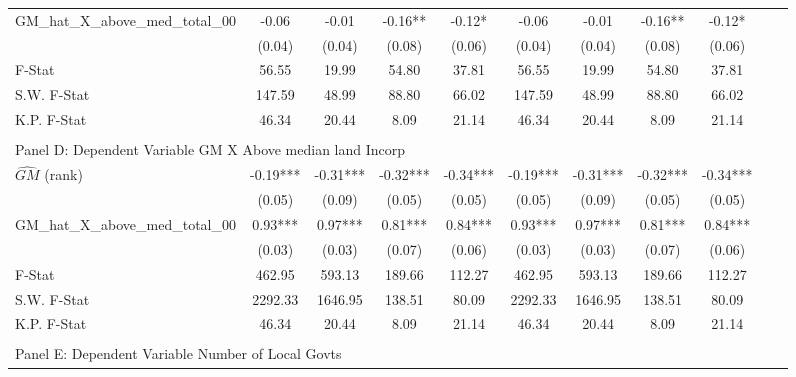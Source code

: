 \begin{table}[htbp]
\begin{threeparttable}
\begin{tabular}{l*{10}{c}}
\addlinespace
GM\_hat\_X\_above\_med\_total\_00&      -0.06   &      -0.01   &      -0.16** &      -0.12*  &      -0.06   &      -0.01   &      -0.16** &      -0.12*  \\
                &     (0.04)   &     (0.04)   &     (0.08)   &     (0.06)   &     (0.04)   &     (0.04)   &     (0.08)   &     (0.06)   \\
\midrule
F-Stat          &      56.55   &      19.99   &      54.80   &      37.81   &      56.55   &      19.99   &      54.80   &      37.81   \\
S.W. F-Stat     &     147.59   &      48.99   &      88.80   &      66.02   &     147.59   &      48.99   &      88.80   &      66.02   \\
K.P. F-Stat     &      46.34   &      20.44   &       8.09   &      21.14   &      46.34   &      20.44   &       8.09   &      21.14   \\
\cmidrule[\heavyrulewidth](lr){1-9} \\ \cmidrule[\heavyrulewidth](lr){1-9}
\multicolumn{8}{l}{Panel D: Dependent Variable GM X Above median land Incorp}\\
\cmidrule(lr){1-9}
$\hat{GM}$ (rank)&      -0.19***&      -0.31***&      -0.32***&      -0.34***&      -0.19***&      -0.31***&      -0.32***&      -0.34***\\
                &     (0.05)   &     (0.09)   &     (0.05)   &     (0.05)   &     (0.05)   &     (0.09)   &     (0.05)   &     (0.05)   \\
\addlinespace
GM\_hat\_X\_above\_med\_total\_00&       0.93***&       0.97***&       0.81***&       0.84***&       0.93***&       0.97***&       0.81***&       0.84***\\
                &     (0.03)   &     (0.03)   &     (0.07)   &     (0.06)   &     (0.03)   &     (0.03)   &     (0.07)   &     (0.06)   \\
\midrule
F-Stat          &     462.95   &     593.13   &     189.66   &     112.27   &     462.95   &     593.13   &     189.66   &     112.27   \\
S.W. F-Stat     &    2292.33   &    1646.95   &     138.51   &      80.09   &    2292.33   &    1646.95   &     138.51   &      80.09   \\
K.P. F-Stat     &      46.34   &      20.44   &       8.09   &      21.14   &      46.34   &      20.44   &       8.09   &      21.14   \\
\cmidrule[\heavyrulewidth](lr){1-9} \\ \cmidrule[\heavyrulewidth](lr){1-9}
\multicolumn{8}{l}{Panel E: Dependent Variable Number of Local Govts}\\

\end{tabular}
\end{threeparttable}
\end{table}
